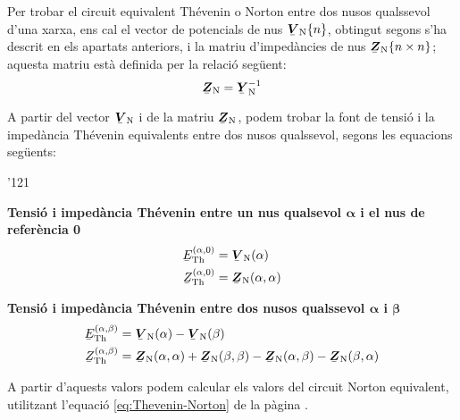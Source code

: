 Per trobar el
circuit equivalent Th\'{e}venin o Norton entre dos nusos qualssevol
d'una xarxa, ens cal el vector de potencials de nus
$\mcmplx{V}\ped{N}\{n\}$, obtingut segons s'ha descrit en els
apartats anteriors, i la matriu d'imped\`{a}ncies de nus
$\mcmplx{Z}\ped{N}\{n\times n\}$; aquesta matriu est\`{a} definida per
la relaci\'{o} seg\"{u}ent:
\begin{equation}
   \mcmplx{Z}\ped{N} = \mcmplx{Y}\ped{N}^{-1}
\end{equation}

A partir del vector $\mcmplx{V}\ped{N}$ i de la matriu
$\mcmplx{Z}\ped{N}$, podem trobar la font de tensi\'{o} i la imped\`{a}ncia
Th\'{e}venin equivalents entre dos nusos qualssevol, segons les
equacions seg\"{u}ents:

\begin{dinglist}{'121}
   \item \textbf{Tensi\'{o} i imped\`{a}ncia Th\'{e}venin entre un nus qualsevol
                 ${\boldsymbol\alpha}$ i el nus de refer\`{e}ncia 0}
   \begin{align}
      \cmplx{E}\ped{Th}^{(\alpha,0)} &= \mcmplx{V}\ped{N}(\alpha) \\
      \cmplx{Z}\ped{Th}^{(\alpha,0)} &= \mcmplx{Z}\ped{N}(\alpha,\alpha)
   \end{align}

   \item \textbf{Tensi\'{o} i imped\`{a}ncia Th\'{e}venin entre dos nusos qualssevol
                 ${\boldsymbol\alpha}$ i ${\boldsymbol\beta}$}
   \begin{align}
      \cmplx{E}\ped{Th}^{(\alpha,\beta)} &= \mcmplx{V}\ped{N}(\alpha) - \mcmplx{V}\ped{N}(\beta) \\
      \cmplx{Z}\ped{Th}^{(\alpha,\beta)} &= \mcmplx{Z}\ped{N}(\alpha,\alpha) +
      \mcmplx{Z}\ped{N}(\beta,\beta) - \mcmplx{Z}\ped{N}(\alpha,\beta) -
       \mcmplx{Z}\ped{N}(\beta,\alpha)
   \end{align}
\end{dinglist}

A partir d'aquests valors podem calcular els valors del circuit Norton equivalent, utilitzant l'equaci\'{o} \eqref{eq:Thevenin-Norton} de la p\`{a}gina \pageref{eq:Thevenin-Norton}.

